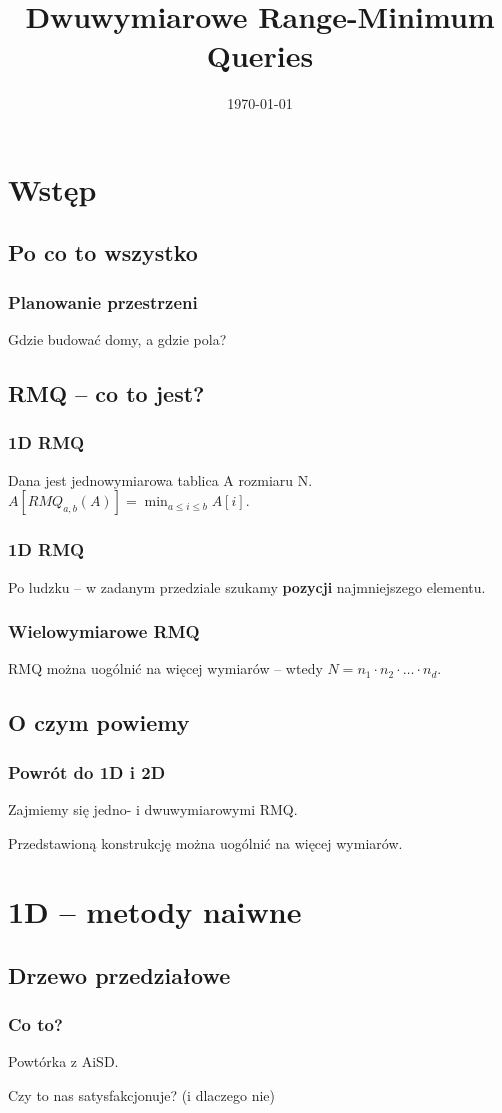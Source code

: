 \documentclass{beamer}
\begin{document}
\title{Dwuwymiarowe Range-Minimum Queries}
\author{}
\date{\today} 


\begin{frame}
\titlepage
\end{frame}


\section{Wstęp}

\subsection{Po co to wszystko}
\begin{frame} \frametitle{Planowanie przestrzeni}
 Gdzie budować domy, a gdzie pola?
\end{frame}

\subsection{RMQ -- co to jest?}
\begin{frame} \frametitle{1D RMQ}
 Dana jest jednowymiarowa tablica A rozmiaru N. $A[RMQ_{a,b}(A)] = \min_{a \leq i \leq b} A[i]$.
\end{frame}

\begin{frame} \frametitle{1D RMQ}
 Po ludzku -- w zadanym przedziale szukamy \textbf{pozycji} najmniejszego elementu.
\end{frame}

\begin{frame} \frametitle{Wielowymiarowe RMQ}
 RMQ można uogólnić na więcej wymiarów -- wtedy $N = n_1 \cdot n_2 \cdot \dots \cdot n_d$.
\end{frame}

\subsection{O czym powiemy}
\begin{frame} \frametitle{Powrót do 1D i 2D}
 Zajmiemy się jedno- i dwuwymiarowymi RMQ.
 
 Przedstawioną konstrukcję można uogólnić na więcej wymiarów.
\end{frame}

\section{1D -- metody naiwne}
\subsection{Drzewo przedziałowe}
\begin{frame} \frametitle{Co to?}
 Powtórka z AiSD.
 
 Czy to nas satysfakcjonuje?
 \pause (i dlaczego nie)
\end{frame}
\end{document}
